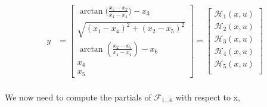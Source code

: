 \documentclass[paper=a4, fontsize=11pt]{scrartcl} %
\numberwithin{equation}{section} %
\numberwithin{figure}{section} %
\numberwithin{table}{section} %
\begin{document}
\begin{framed}
\begin{align*}
  y &= \begin{bmatrix} \arctan{(\frac{x_5 - x_2}{x_4 - x_1}}) - x_3   \\ 
                \sqrt{ (x_1 - x_4)^2 + (x_2 - x_5)^2}  \\
                \arctan{(\frac{x_2 - x_5}{x_1 - x_4})} - x_6 \\
                x_4 \\
                x_5
  \end{bmatrix} 
            = \begin{bmatrix}
           \mathcal{H}_1(x,u) \\
           \mathcal{H}_2(x,u) \\
           \mathcal{H}_3(x,u) \\
           \mathcal{H}_4(x,u) \\
           \mathcal{H}_5(x,u) \\
         \end{bmatrix}\\
\end{align*}
 
We now need to compute the partials of  $\mathcal{F}_{1\dots6}$ with respect to x,


\end{framed}
\end{document}
